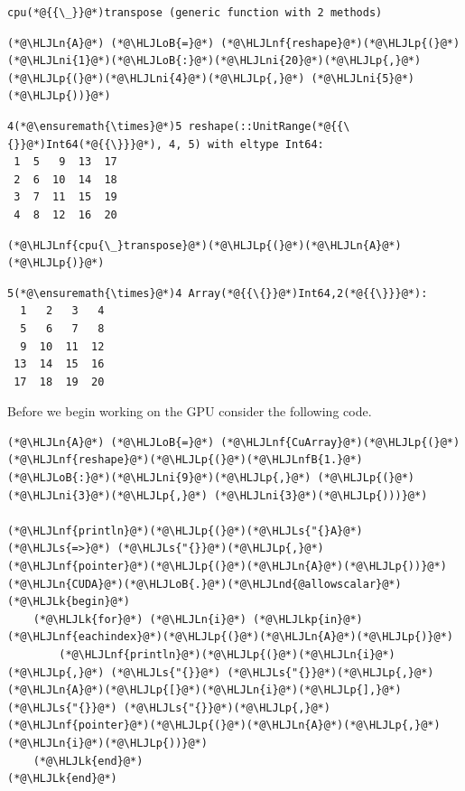 \documentclass[12pt,a4paper]{article}
\newcommand{\HLJLk}[1]{\textcolor[RGB]{148,91,176}{\textbf{#1}}}
\newcommand{\HLJLkp}[1]{\textcolor[RGB]{148,91,176}{\textbf{#1}}}
\newcommand{\HLJLn}[1]{#1}
\newcommand{\HLJLnd}[1]{\textcolor[RGB]{214,102,97}{#1}}
\newcommand{\HLJLnf}[1]{\textcolor[RGB]{66,102,213}{#1}}
\newcommand{\HLJLs}[1]{\textcolor[RGB]{201,61,57}{#1}}
\newcommand{\HLJLnfB}[1]{\textcolor[RGB]{59,151,46}{#1}}
\newcommand{\HLJLni}[1]{\textcolor[RGB]{59,151,46}{#1}}
\newcommand{\HLJLoB}[1]{\textcolor[RGB]{102,102,102}{\textbf{#1}}}
\newcommand{\HLJLp}[1]{#1}
\begin{document}
\begin{lstlisting}
cpu(*@{{\_}}@*)transpose (generic function with 2 methods)
\end{lstlisting}


\begin{lstlisting}
(*@\HLJLn{A}@*) (*@\HLJLoB{=}@*) (*@\HLJLnf{reshape}@*)(*@\HLJLp{(}@*)(*@\HLJLni{1}@*)(*@\HLJLoB{:}@*)(*@\HLJLni{20}@*)(*@\HLJLp{,}@*) (*@\HLJLp{(}@*)(*@\HLJLni{4}@*)(*@\HLJLp{,}@*) (*@\HLJLni{5}@*)(*@\HLJLp{))}@*)
\end{lstlisting}

\begin{lstlisting}
4(*@\ensuremath{\times}@*)5 reshape(::UnitRange(*@{{\{}}@*)Int64(*@{{\}}}@*), 4, 5) with eltype Int64:
 1  5   9  13  17
 2  6  10  14  18
 3  7  11  15  19
 4  8  12  16  20
\end{lstlisting}


\begin{lstlisting}
(*@\HLJLnf{cpu{\_}transpose}@*)(*@\HLJLp{(}@*)(*@\HLJLn{A}@*)(*@\HLJLp{)}@*)
\end{lstlisting}

\begin{lstlisting}
5(*@\ensuremath{\times}@*)4 Array(*@{{\{}}@*)Int64,2(*@{{\}}}@*):
  1   2   3   4
  5   6   7   8
  9  10  11  12
 13  14  15  16
 17  18  19  20
\end{lstlisting}


Before we begin working on the GPU consider the following code.


\begin{lstlisting}
(*@\HLJLn{A}@*) (*@\HLJLoB{=}@*) (*@\HLJLnf{CuArray}@*)(*@\HLJLp{(}@*)(*@\HLJLnf{reshape}@*)(*@\HLJLp{(}@*)(*@\HLJLnfB{1.}@*)(*@\HLJLoB{:}@*)(*@\HLJLni{9}@*)(*@\HLJLp{,}@*) (*@\HLJLp{(}@*)(*@\HLJLni{3}@*)(*@\HLJLp{,}@*) (*@\HLJLni{3}@*)(*@\HLJLp{)))}@*)

(*@\HLJLnf{println}@*)(*@\HLJLp{(}@*)(*@\HLJLs{"{}A}@*) (*@\HLJLs{=>}@*) (*@\HLJLs{"{}}@*)(*@\HLJLp{,}@*) (*@\HLJLnf{pointer}@*)(*@\HLJLp{(}@*)(*@\HLJLn{A}@*)(*@\HLJLp{))}@*)
(*@\HLJLn{CUDA}@*)(*@\HLJLoB{.}@*)(*@\HLJLnd{@allowscalar}@*) (*@\HLJLk{begin}@*)
    (*@\HLJLk{for}@*) (*@\HLJLn{i}@*) (*@\HLJLkp{in}@*) (*@\HLJLnf{eachindex}@*)(*@\HLJLp{(}@*)(*@\HLJLn{A}@*)(*@\HLJLp{)}@*)
        (*@\HLJLnf{println}@*)(*@\HLJLp{(}@*)(*@\HLJLn{i}@*)(*@\HLJLp{,}@*) (*@\HLJLs{"{}}@*) (*@\HLJLs{"{}}@*)(*@\HLJLp{,}@*) (*@\HLJLn{A}@*)(*@\HLJLp{[}@*)(*@\HLJLn{i}@*)(*@\HLJLp{],}@*) (*@\HLJLs{"{}}@*) (*@\HLJLs{"{}}@*)(*@\HLJLp{,}@*) (*@\HLJLnf{pointer}@*)(*@\HLJLp{(}@*)(*@\HLJLn{A}@*)(*@\HLJLp{,}@*) (*@\HLJLn{i}@*)(*@\HLJLp{))}@*)
    (*@\HLJLk{end}@*)
(*@\HLJLk{end}@*)
\end{lstlisting}
\end{document}
